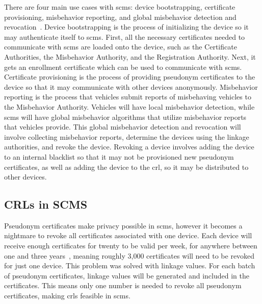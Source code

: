 \documentclass {article}
\begin{document}
There are four main use cases with \gls{scms}: device bootstrapping, certificate provisioning, misbehavior reporting, and global misbehavior detection and revocation~\autocite{brecht_security_2018}. Device bootstrapping is the process of initializing the device so it may authenticate itself to \gls{scms}. First, all the necessary certificates needed to communicate with \gls{scms} are loaded onto the device, such as the Certificate Authorities, the Misbehavior Authority, and the Registration Authority. Next, it gets an enrollment certificate which can be used to communicate with \gls{scms}. Certificate provisioning is the process of providing pseudonym certificates to the device so that it may communicate with other devices anonymously. Misbehavior reporting is the process that vehicles submit reports of misbehaving vehicles to the Misbehavior Authority. Vehicles will have local misbehavior detection, while \gls{scms} will have global misbehavior algorithms that utilize misbehavior reports that vehicles provide. This global misbehavior detection and revocation will involve collecting misbehavior reports, determine the devices using the linkage authorities, and revoke the device. Revoking a device involves adding the device to an internal blacklist so that it may not be provisioned new pseudonym certificates, as well as adding the device to the \gls{crl}, so it may be distributed to other devices.

\subsection{CRLs in SCMS}
Pseudonym certificates make privacy possible in \gls{scms}, however it becomes a nightmare to revoke all certificates associated with one device. Each device will receive enough certificates for twenty to be valid per week, for anywhere between one and three years~\autocite{brecht_security_2018}, meaning roughly 3,000 certificates will need to be revoked for just one device. This problem was solved with linkage values. For each batch of pseudonym certificates, linkage values will be generated and included in the certificates. This means only one number is needed to revoke all pseudonym certificates, making \gls{crl}s feasible in \gls{scms}.
\end{document}
